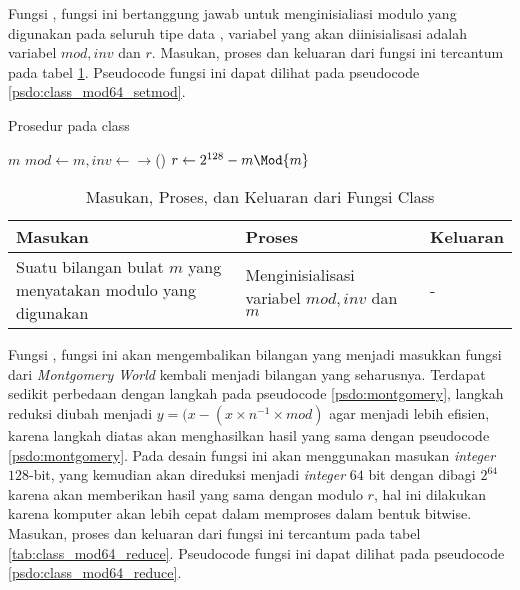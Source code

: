 Fungsi , fungsi ini bertanggung jawab untuk menginisialiasi modulo yang digunakan pada seluruh tipe data , variabel yang akan diinisialisasi adalah variabel $ mod, inv $ dan $ r $. Masukan, proses dan keluaran dari fungsi ini tercantum pada tabel \ref{tab:class_mod64_setmod}. Pseudocode fungsi ini dapat dilihat pada pseudocode \ref{psdo:class_mod64_setmod}.

\begin{algorithm}
	\caption{Prosedur  pada class }
	\label{psdo:class_mod64_setmod}
	\begin{algorithmic}[1]
		\Require $ m $
		\State $ mod \leftarrow m , inv \leftarrow $$\rightarrow$()
		\State $ r \leftarrow 2^{128} - m \Mod{m} $
	\end{algorithmic}
\end{algorithm}

\begin{table}[]
	\Centering
	\begin{tabular}{|p{3cm}|p{3cm}|p{3cm}|}
	\hline
	Masukan                                                      & Proses                                   & Keluaran \\ \hline
	Suatu bilangan bulat $m$ yang menyatakan modulo yang digunakan & Menginisialisasi variabel $mod, inv$ dan $m$ & -        \\ \hline
	\end{tabular}
	\caption{Masukan, Proses, dan Keluaran dari Fungsi  Class }
	\label{tab:class_mod64_setmod}
\end{table}

\newpage

Fungsi , fungsi ini akan mengembalikan bilangan yang menjadi masukkan fungsi dari \textit{Montgomery World} kembali menjadi bilangan yang seharusnya. Terdapat sedikit perbedaan dengan langkah pada pseudocode \ref{psdo:montgomery}, langkah reduksi diubah menjadi $ y = ( x - ( x \times n^{-1} \times mod )$ agar menjadi lebih efisien, karena langkah diatas akan menghasilkan hasil yang sama dengan pseudocode \ref{psdo:montgomery}. Pada desain fungsi ini akan menggunakan masukan \textit{integer} $128$-bit, yang kemudian akan direduksi menjadi \textit{integer} $64$ bit dengan dibagi $2^{64}$ karena akan memberikan hasil yang sama dengan modulo $ r $, hal ini dilakukan karena komputer akan lebih cepat dalam memproses dalam bentuk bitwise. Masukan, proses dan keluaran dari fungsi ini tercantum pada tabel \ref{tab:class_mod64_reduce}. Pseudocode fungsi ini dapat dilihat pada pseudocode \ref{psdo:class_mod64_reduce}.

